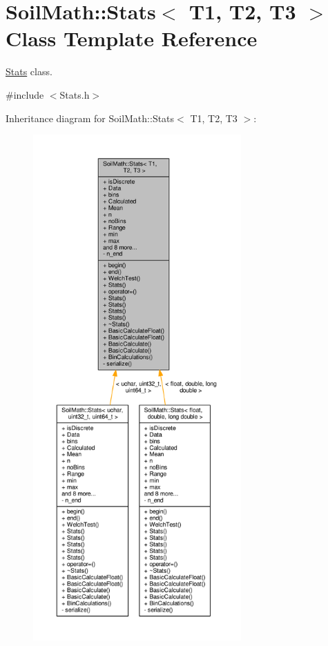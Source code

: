 \hypertarget{class_soil_math_1_1_stats}{}\section{Soil\+Math\+:\+:Stats$<$ T1, T2, T3 $>$ Class Template Reference}
\label{class_soil_math_1_1_stats}


\hyperlink{class_soil_math_1_1_stats}{Stats} class.  




{\ttfamily \#include $<$Stats.\+h$>$}



Inheritance diagram for Soil\+Math\+:\+:Stats$<$ T1, T2, T3 $>$\+:\nopagebreak
\begin{figure}[H]
\begin{center}
\leavevmode
\includegraphics[height=550pt]{class_soil_math_1_1_stats__inherit__graph}
\end{center}
\end{figure}


